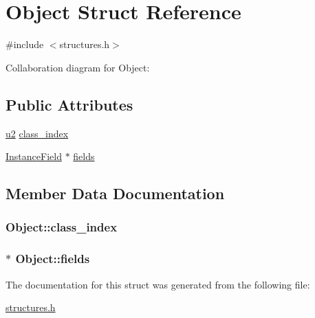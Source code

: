 \hypertarget{structObject}{}\section{Object Struct Reference}
\label{structObject}


{\ttfamily \#include $<$structures.\+h$>$}



Collaboration diagram for Object\+:
\subsection*{Public Attributes}
\begin{DoxyCompactItemize}
\item 
\hyperlink{structures_8h_a55ef8d87fd202b8417704c089899c5b9}{u2} \hyperlink{structObject_a01bbcbf2d8f45a2ee870d1957940a6d7}{class\+\_\+index}
\item 
\hyperlink{structInstanceField}{Instance\+Field} $\ast$ \hyperlink{structObject_a80adc59e34cc54216d8e7a6c9a4e9264}{fields}
\end{DoxyCompactItemize}


\subsection{Member Data Documentation}
\subsubsection[{\texorpdfstring{class\+\_\+index}{class_index}}]{ Object\+::class\+\_\+index}\hypertarget{structObject_a01bbcbf2d8f45a2ee870d1957940a6d7}{}\label{structObject_a01bbcbf2d8f45a2ee870d1957940a6d7}
\subsubsection[{\texorpdfstring{fields}{fields}}]{$\ast$ Object\+::fields}\hypertarget{structObject_a80adc59e34cc54216d8e7a6c9a4e9264}{}\label{structObject_a80adc59e34cc54216d8e7a6c9a4e9264}


The documentation for this struct was generated from the following file\+:\begin{DoxyCompactItemize}
\item 
\hyperlink{structures_8h}{structures.\+h}\end{DoxyCompactItemize}
